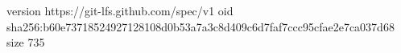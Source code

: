 version https://git-lfs.github.com/spec/v1
oid sha256:b60e73718524927128108d0b53a7a3c8d409c6d7faf7ccc95cfae2e7ca037d68
size 735

